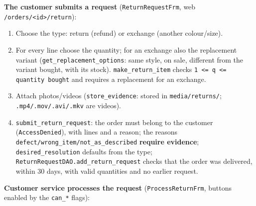 \textbf{The customer submits a request} (\texttt{ReturnRequestFrm}, web
\texttt{/\allowbreak{}orders/\allowbreak{}\textless{}id\textgreater{}\allowbreak{}/\allowbreak{}return}):

\begin{enumerate}
\def\labelenumi{\arabic{enumi}.}
\tightlist
\item
  Choose the type: return (refund) or exchange (another colour/size).
\item
  For every line choose the quantity; for an exchange also the
  replacement variant (\texttt{get\_\allowbreak{}replacement\_\allowbreak{}options}: same style,
  on sale, different from the variant bought, with its stock).
  \texttt{make\_\allowbreak{}return\_\allowbreak{}item} checks
  \texttt{1 \textless{}=\allowbreak{} q \textless{}=\allowbreak{} quantity bought} and
  requires a replacement for an exchange.
\item
  Attach photos/videos (\texttt{store\_\allowbreak{}evidence}: stored in
  \texttt{media/\allowbreak{}returns/\allowbreak{}}; \texttt{.\allowbreak{}mp4/\allowbreak{}.\allowbreak{}mov/\allowbreak{}.\allowbreak{}avi/\allowbreak{}.\allowbreak{}mkv} are videos).
\item
  \texttt{submit\_\allowbreak{}return\_\allowbreak{}request}: the order must belong to the
  customer (\texttt{AccessDenied}), with lines and a reason; the reasons
  \texttt{defect/\allowbreak{}wrong\_\allowbreak{}item/\allowbreak{}not\_\allowbreak{}as\_\allowbreak{}described} \textbf{require
  evidence}; \texttt{desired\_\allowbreak{}resolution} defaults from the type;
  \texttt{ReturnRequestDAO.\allowbreak{}add\_\allowbreak{}return\_\allowbreak{}request} checks that the order
  was delivered, within 30 days, with valid quantities and no earlier
  request.
\end{enumerate}

\textbf{Customer service processes the request}
(\texttt{ProcessReturnFrm}, buttons enabled by the \texttt{can\_\allowbreak{}*}
flags):

